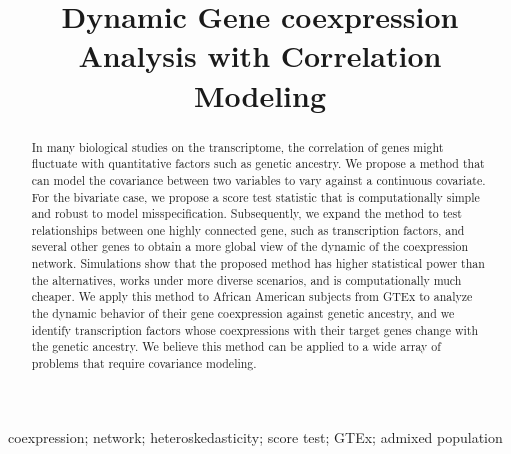 \documentclass[aap, preprint]{imsart}
\numberwithin{equation}{section}
\theoremstyle{plain}
\begin{document}
\begin{frontmatter}
\title{Dynamic Gene coexpression Analysis with Correlation Modeling}


\begin{abstract}
In many biological studies on the transcriptome, the correlation of genes might fluctuate with quantitative factors such as genetic ancestry. We propose a method that can model the covariance between two variables to vary against a continuous covariate. For the bivariate case, we propose a score test statistic that is computationally simple and robust to model misspecification. Subsequently, we expand the method to test relationships between one highly connected gene, such as transcription factors, and several other genes to obtain a more global view of the dynamic of the coexpression network. Simulations show that the proposed method has higher statistical power than the alternatives, works under more diverse scenarios, and is computationally much cheaper. We apply this method to African American subjects from GTEx to analyze the dynamic behavior of their gene coexpression against genetic ancestry, and we identify transcription factors whose coexpressions with their target genes change with the genetic ancestry. We believe this method can be applied to a wide array of problems that require covariance modeling.
\end{abstract}

\begin{keyword}
coexpression; network; heteroskedasticity; score test; GTEx; admixed population
\end{keyword}

\end{frontmatter}
\end{document}
